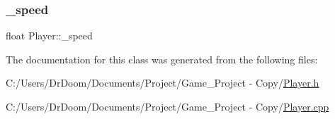 \mbox{\label{class_player_a2058005a9cb8d0ee1930178ab5965ac1}} 
\subsubsection{\texorpdfstring{\+\_\+speed}{\_speed}}
{\footnotesize\ttfamily float Player\+::\+\_\+speed\hspace{0.3cm}{\ttfamily [private]}}



The documentation for this class was generated from the following files\+:\begin{DoxyCompactItemize}
\item 
C\+:/\+Users/\+Dr\+Doom/\+Documents/\+Project/\+Game\+\_\+\+Project -\/ Copy/\hyperlink{_player_8h}{Player.\+h}\item 
C\+:/\+Users/\+Dr\+Doom/\+Documents/\+Project/\+Game\+\_\+\+Project -\/ Copy/\hyperlink{_player_8cpp}{Player.\+cpp}\end{DoxyCompactItemize}

